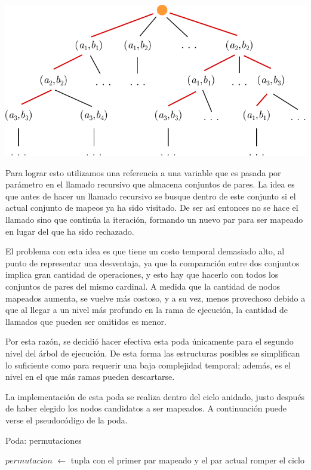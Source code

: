 \begin{center}
\includegraphics[width=.7\textwidth]{imagenes/ex2_execution_tree.pdf}
\end{center}

Para lograr esto utilizamos una referencia a una variable que es pasada por
parámetro en el llamado recursivo que almacena conjuntos de pares. La idea es
que antes de hacer un llamado recursivo se busque dentro de este conjunto
si el actual conjunto de mapeos ya ha sido visitado. De ser así entonces no se
hace el llamado sino que continúa la iteración, formando un nuevo par para ser
mapeado en lugar del que ha sido rechazado.

El problema con esta idea es que tiene un costo temporal demasiado alto, al
punto de representar una desventaja, ya que la comparación entre dos conjuntos
implica gran cantidad de operaciones, y esto hay que hacerlo con todos los
conjuntos de pares del mismo cardinal. A medida que la cantidad de nodos
mapeados aumenta, se vuelve más costoso, y a su vez, menos provechoso debido
a que al llegar a un nivel más profundo en la rama de ejecución, la cantidad
de llamados que pueden ser omitidos es menor.

Por esta razón, se decidió hacer efectiva esta poda únicamente para el segundo
nivel del árbol de ejecución. De esta forma las estructuras posibles se
simplifican lo suficiente como para requerir una baja complejidad temporal;
además, es el nivel en el que más ramas pueden descartarse.

La implementación de esta poda se realiza dentro del ciclo anidado, justo
después de haber elegido los nodos candidatos a ser mapeados. A continuación
puede verse el pseudocódigo de la poda.

\begin{algorithm}
    \caption{Poda: permutaciones}
     {
        $permutacion$ $\gets$ tupla con el primer par mapeado y el par actual \;
         {
            romper el ciclo \;
        }
    }
\end{algorithm}

